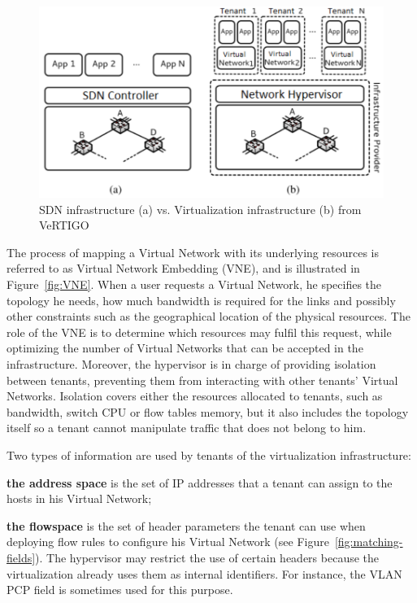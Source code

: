 \begin{figure}[ht]
    \centering
    \includegraphics[scale=0.9]{figures/virt-archi.pdf}
    \caption{SDN infrastructure (a) vs. Virtualization infrastructure (b) from VeRTIGO~\cite{VeRTIGO-Corin2012a}}
    \label{fig:virt-archi}
\end{figure}


The process of mapping a Virtual Network with its underlying resources is referred to as Virtual Network Embedding (VNE), and is illustrated in Figure~\ref{fig:VNE}.
When a user requests a Virtual Network, he specifies the topology he needs, how much bandwidth is required for the links and possibly other constraints such as the geographical location of the physical resources.
The role of the VNE is to determine which resources may fulfil this request, while optimizing the number of Virtual Networks that can be accepted in the infrastructure.
Moreover, the hypervisor is in charge of providing isolation between tenants, preventing them from interacting with other tenants' Virtual Networks. Isolation covers either the resources allocated to tenants, such as bandwidth, switch CPU or flow tables memory, but it also includes the topology itself so a tenant cannot manipulate traffic that does not belong to him.

Two types of information are used by tenants of the virtualization infrastructure:
\begin{inparaenum}[a)]
\item \textbf{the address space} is the set of IP addresses that a tenant can assign to the hosts in his Virtual Network;
\item \textbf{the flowspace} is the set of header parameters the tenant can use when deploying flow rules to configure his Virtual Network (see Figure~\ref{fig:matching-fields}). The hypervisor may restrict the use of certain headers because the virtualization already uses them as internal identifiers. For instance, the VLAN PCP field is sometimes used for this purpose.
\end{inparaenum}

